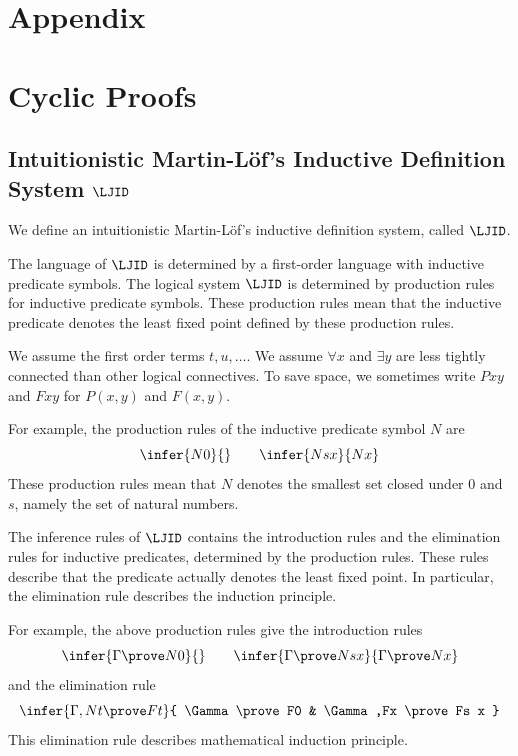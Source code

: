 \appendix
\section*{Appendix}

\section{Cyclic Proofs}

\subsection{Intuitionistic Martin-L\"of's Inductive Definition System $\LJID$}

We define
an intuitionistic Martin-L\"of's inductive definition system, called $\LJID$.

The language of $\LJID$ is determined by a first-order language with
inductive predicate symbols.
The logical system $\LJID$ is determined by production rules
for inductive predicate symbols.
These production rules mean that 
the inductive predicate denotes 
the least fixed point defined by these production rules.

We assume the first order terms $t,u, \ldots$.
We assume $\forall x$ and $\exists y$ are less tightly connected than other
logical connectives.
To save space,
we sometimes write $Pxy$ and $Fxy$ for $P(x,y)$ and $F(x,y)$.

For example, 
the production rules of the inductive predicate symbol $N$ are
\[
\infer{N0}{}
\qquad
\infer{Ns x}{Nx}
\]
These production rules mean that 
$N$ denotes the smallest set closed under 0 and $s$,
namely the set of natural numbers.

The inference rules of $\LJID$ contains
the introduction rules and the elimination rules for inductive predicates,
determined by the production rules.
These rules describe that the predicate actually denotes the least fixed point.
In particular, the elimination rule describes the induction principle.

For example, the above production rules give the introduction rules
\[
\infer{\Gamma \prove N0}{}
\qquad
\infer{\Gamma \prove Ns x}{\Gamma \prove Nx}
\]
and the elimination rule
\[
\infer{\Gamma,Nt \prove Ft}{
\Gamma \prove F0
&
\Gamma,Fx \prove Fs x
}
\]
This elimination rule describes mathematical induction principle.

